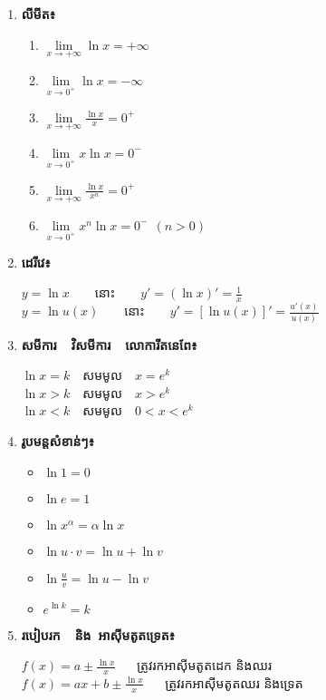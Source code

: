 \documentclass[12pt, a5paper]{article}
\begin{document}
\begin{enumerate}[m]
	\item \textbf{\sffamily លីមីត៖}
	\begin{enumerate}[k,2]
		\item $\lim\limits_{x\to+\infty}\ln x=+\infty$
		\item $\lim\limits_{x\to 0^+}\ln x=-\infty$
		\item $\lim\limits_{x\to+\infty}\frac{\ln x}{x}=0^+$		
		\item $\lim\limits_{x\to0^+}x\ln x=0^-$
		\item $\lim\limits_{x\to+\infty}\frac{\ln x}{x^n}=0^+$
		\item $\lim\limits_{x\to0^+}x^n\ln x=0^-~~(n>0)$
	\end{enumerate}
	\item \textbf{\sffamily ដេរីវេ៖}
	\begin{center}
		$y=\ln x$~~~~នោះ~~~~$y'=(\ln x)'=\frac{1}{x}$\\
		$y=\ln u(x)$~~~~នោះ~~~~$y'=[\ln u(x)]'=\frac{u'(x)}{u(x)}$
	\end{center}
	\item \textbf{\sffamily សមីការ~~វិសមីការ~~លោការីតនេពែ៖}
	\begin{center}
		$\ln x=k$~~សមមូល~~$x=e^k$\\
		$\ln x>k$~~សមមូល~~$x>e^k$\\
		$\ln x<k$~~សមមូល~~$0<x<e^k$
	\end{center}
	\item \textbf{\sffamily រូបមន្តសំខាន់ៗ៖}
	\begin{multicols}{3}
		\begin{itemize}
			\item $\ln1=0$				
			\item $\ln e=1$
			\item $\ln x^\alpha=\alpha\ln x$ 
			\item $\ln u\cdot v=\ln u+\ln v$
			\item $\ln \frac{u}{v}=\ln u-\ln v$
			\item $e^{\ln k} =k$
		\end{itemize}
	\end{multicols}\newpage
	\item \textbf{\sffamily របៀបរក~~និង~អាស៊ីមតូតទ្រេត៖}
	\begin{center}
		$f(x)=a\pm \frac{\ln x}{x}$ ~~ ត្រូវរកអាស៊ីមតូតដេក និងឈរ\\
		$f(x)=ax+b\pm \frac{\ln x}{x}$ ~~ ត្រូវរកអាស៊ីមតូតឈរ និងទ្រេត
	\end{center}

\end{enumerate}
\end{document}
